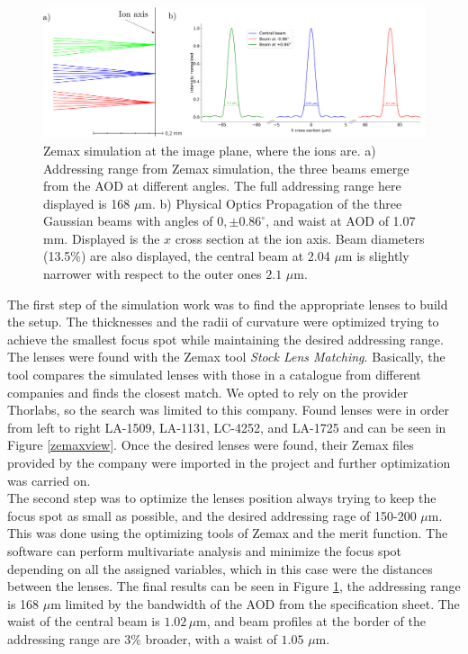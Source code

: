 \begin{figure}
     \centering
     \centering
     \includegraphics[width=1\textwidth]{img/range_plus_3beams}
     \caption{Zemax simulation at the image plane, where the ions are. a) Addressing range from Zemax simulation, the three beams emerge from the AOD at different angles. The full addressing range here displayed is 168 $\mu$m. b) Physical Optics Propagation of the three Gaussian beams with angles of $0,\pm0.86^\circ$, and waist at AOD of 1.07 mm. Displayed is the $x$ cross section at the ion axis. Beam diameters (13.5\%) are also displayed, the central beam at 2.04 $\mu$m is slightly narrower with respect to the outer ones $2.1$ $\mu$m.}
     \label{zemaxrange}
\end{figure}
The first step of the simulation work was to find the appropriate lenses to build the setup. The thicknesses and the radii of curvature were optimized trying to achieve the smallest focus spot while maintaining the desired addressing range. The lenses were found with the Zemax tool \emph{Stock Lens Matching}. Basically, the tool compares the simulated lenses with those in a catalogue from different companies and finds the closest match. We opted to rely on the provider Thorlabs, so the search was limited to this company. Found lenses were in order from left to right LA-1509, LA-1131, LC-4252, and LA-1725 and can be seen in Figure \ref{zemaxview}. Once the desired lenses were found, their Zemax files provided by the company were imported in the project and further optimization was carried on.\\
The second step was to optimize the lenses position always trying to keep the focus spot as small as possible, and the desired addressing rage of 150-200 $\mu$m. This was done using the optimizing tools of Zemax and the merit function. The software can perform multivariate analysis and minimize the focus spot depending on all the assigned variables, which in this case were the distances between the lenses. The final results can be seen in Figure \ref{zemaxrange}, the addressing range is 168 $\mu$m limited by the bandwidth of the AOD from the specification sheet. The waist of the central beam is $1.02\,\mu$m, and beam profiles at the border of the addressing range are $3\%$ broader, with a waist of $1.05$ $\mu$m.\\
